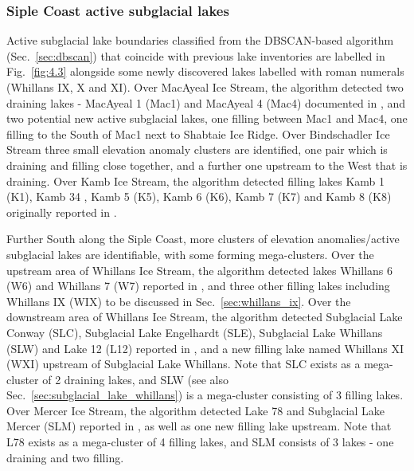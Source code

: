\subsubsection{Siple Coast active subglacial lakes} \label{sec:siple_coast_lakes}

Active subglacial lake boundaries classified from the \gls{DBSCAN}-based algorithm (Sec.~\ref{sec:dbscan}) that coincide with previous lake inventories \citep{Smithinventoryactivesubglacial2009,SiegfriedThirteenyearssubglacial2018} are labelled in Fig.~\ref{fig:4.3} alongside some newly discovered lakes labelled with roman numerals (Whillans IX, X and XI).
Over MacAyeal Ice Stream, the algorithm detected two draining lakes - MacAyeal 1 (Mac1) and MacAyeal 4 (Mac4) documented in \citet{FrickerSynthesizingmultipleremotesensing2010}, and two potential new active subglacial lakes, one filling between Mac1 and Mac4, one filling to the South of Mac1 next to Shabtaie Ice Ridge.
Over Bindschadler Ice Stream three small elevation anomaly clusters are identified, one pair which is draining and filling close together, and a further one upstream to the West that is draining.
Over Kamb Ice Stream, the algorithm detected filling lakes Kamb 1 (K1), Kamb 34 \citep[K34, see also][]{KimActivesubglaciallakes2016}, Kamb 5 (K5), Kamb 6 (K6), Kamb 7 (K7) and Kamb 8 (K8) originally reported in \citet{Smithinventoryactivesubglacial2009}.

Further South along the Siple Coast, more clusters of elevation anomalies/active subglacial lakes are identifiable, with some forming mega-clusters.
Over the upstream area of Whillans Ice Stream, the algorithm detected lakes Whillans 6 (W6) and Whillans 7 (W7) reported in \citet{Smithinventoryactivesubglacial2009}, and three other filling lakes including Whillans IX (WIX) to be discussed in Sec.~\ref{sec:whillans_ix}.
Over the downstream area of Whillans Ice Stream, the algorithm detected Subglacial Lake Conway (SLC), Subglacial Lake Engelhardt (SLE), Subglacial Lake Whillans (SLW) and Lake 12 (L12) reported in \citet{FrickerConnectedsubglaciallake2009}, and a new filling lake named Whillans XI (WXI) upstream of Subglacial Lake Whillans.
Note that SLC exists as a mega-cluster of 2 draining lakes, and SLW (see also Sec.~\ref{sec:subglacial_lake_whillans}) is a mega-cluster consisting of 3 filling lakes.
Over Mercer Ice Stream, the algorithm detected Lake 78 \citep[L78; see also][]{SiegfriedThirteenyearssubglacial2018} and Subglacial Lake Mercer (SLM) reported in \citet{FrickerConnectedsubglaciallake2009}, as well as one new filling lake upstream.
Note that L78 exists as a mega-cluster of 4 filling lakes, and SLM consists of 3 lakes - one draining and two filling.

